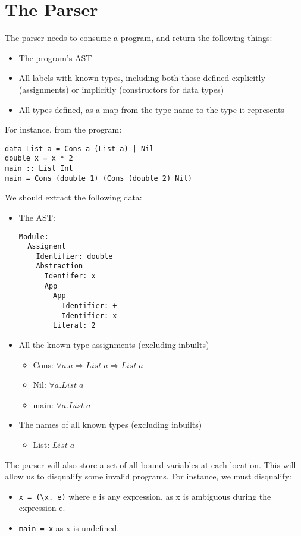 \documentclass[
author=Kiran Sturt,
degree=BSc,
title=Implementing a Step by Step Evaluator for a Simple Functional Programming language,
unit=COMS30045,twoside]{dissertation}
\theoremstyle{definition}
\theoremstyle{break}
\theoremstyle{definition}
\begin{document}
\section{The Parser}
The parser needs to consume a program, and return the following things:
\begin{itemize}
    \item The program's AST
    \item All labels with known types, including both those defined explicitly (assignments) or implicitly (constructors for data types)
    \item All types defined, as a map from the type name to the type it represents
\end{itemize}
For instance, from the program:
\begin{lstlisting}[]
data List a = Cons a (List a) | Nil
double x = x * 2	
main :: List Int
main = Cons (double 1) (Cons (double 2) Nil)
\end{lstlisting}
We should extract the following data:
\begin{itemize}
    \item The AST: {\filbreak
    \begin{lstlisting}[]
Module:
  Assignent
    Identifier: double
    Abstraction
      Identifer: x
      App
        App
          Identifier: +
          Identifier: x
        Literal: 2
    \end{lstlisting}}
    \item All the known type assignments (excluding inbuilts)
        \begin{itemize}
            \item Cons: \(\forall a. a \Rightarrow List\;a\Rightarrow List\;a\)
            \item Nil: \(\forall a. List\;a\)
            \item main: \(\forall a. List\;a\)
        \end{itemize}
    \item The names of all known types (excluding inbuilts) 
        \begin{itemize}
            \item List: \(List\;a\)
        \end{itemize}
\end{itemize}

The parser will also store a set of all bound variables at each location. This will allow us to disqualify some invalid programs. For instance, we must disqualify:
\begin{itemize}
    \item \verb|x = (\x. e)| where e is any expression, as x is ambiguous during the expression e.
    \item \verb|main = x| as x is undefined.
\end{itemize}
\end{document}
